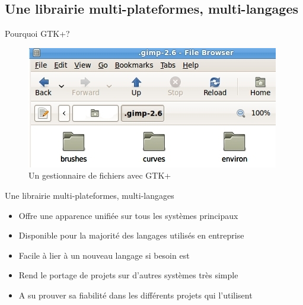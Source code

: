 \documentclass{beamer}
\begin{document}
  \subsection{Une librairie multi-plateformes, multi-langages}
  \begin{frame}{Pourquoi GTK+?}
    \begin{figure}[htb]
    \centering
    \includegraphics[scale=0.6]{"gtkplus"}
    \caption{Un gestionnaire de fichiers avec GTK+}
    \label{fig:gtk}
    \end{figure}
  \end{frame}
  \begin{frame}{Une librairie multi-plateformes, multi-langages}
  \begin{itemize}
    \item Offre une apparence unifiée sur tous les systèmes principaux\\
    \item Disponible pour la majorité des langages utilisés en entreprise\\
    \item Facile à lier à un nouveau langage si besoin est\\
    \item Rend le portage de projets sur d'autres systèmes très simple\\
    \item A su prouver sa fiabilité dans les différents projets qui l'utilisent
  \end{itemize}
  \end{frame}
\end{document}
